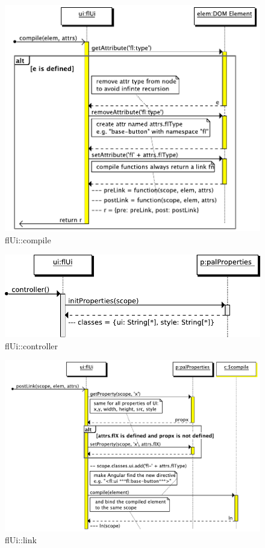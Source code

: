 \begin{figure}[htb]
    \centering
    \includegraphics{figures/design/seqdia/ui-compile.pdf}
    \caption{flUi::compile}
    \label{fig:design-seqdia-ui-compile}
\end{figure}

\begin{figure}[htb]
    \centering
    \includegraphics{figures/design/seqdia/ui-controller.pdf}
    \caption{flUi::controller}
    \label{fig:design-seqdia-ui-controller}
\end{figure}

\begin{figure}[htb]
    \centering
    \includegraphics{figures/design/seqdia/ui-link.pdf}
    \caption{flUi::link}
    \label{fig:design-seqdia-ui-link}
\end{figure}


